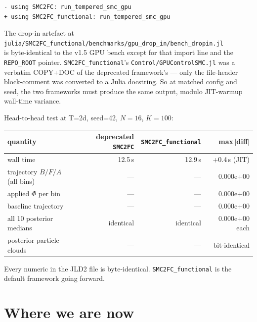 \documentclass[11pt,a4paper]{article}
\begin{document}
\begin{lstlisting}
- using SMC2FC: run_tempered_smc_gpu
+ using SMC2FC_functional: run_tempered_smc_gpu
\end{lstlisting}

The drop-in artefact at\\
\texttt{julia/SMC2FC\_functional/benchmarks/gpu\_drop\_in/bench\_dropin.jl}\\
is byte-identical to the v1.5 GPU bench except for that import line
and the \texttt{REPO\_ROOT} pointer. \texttt{SMC2FC\_functional}'s
\texttt{Control/GPUControlSMC.jl} was a verbatim COPY+DOC of the
deprecated framework's --- only the file-header block-comment was
converted to a Julia docstring. So at matched config and seed, the
two frameworks must produce the same output, modulo JIT-warmup
wall-time variance.

Head-to-head test at T=2d, seed=42, $N=16$, $K=100$:

\begin{center}
\begin{tabular}{lrrr}
  \toprule
  quantity                            & deprecated \texttt{SMC2FC}
                                      & \texttt{SMC2FC\_functional}
                                      & max\,$|$diff$|$ \\
  \midrule
  wall time                           & 12.5\,s  & 12.9\,s  & +0.4\,s (JIT) \\
  trajectory $B / F / A$ (all bins)   & ---      & ---      & 0.000e+00     \\
  applied $\Phi$ per bin              & ---      & ---      & 0.000e+00     \\
  baseline trajectory                 & ---      & ---      & 0.000e+00     \\
  all 10 posterior medians            & identical& identical& 0.000e+00 each\\
  posterior particle clouds           & ---      & ---      & bit-identical \\
  \bottomrule
\end{tabular}
\end{center}

Every numeric in the JLD2 file is byte-identical.
\texttt{SMC2FC\_functional} is the default framework going forward.

\section{Where we are now}
\end{document}
